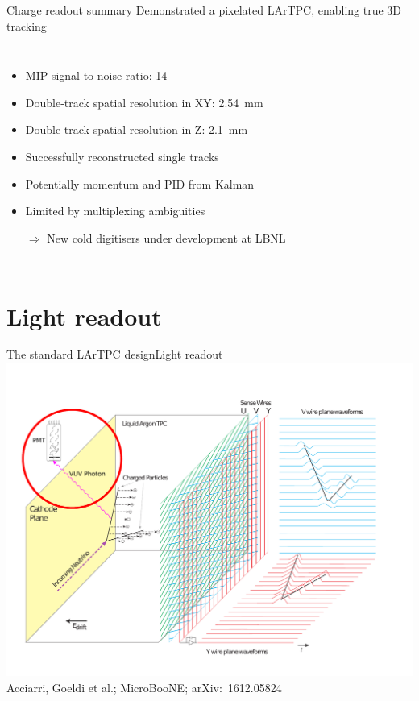 \documentclass[]{beamer}
\newcommand*{\emphcol}{red}
\newcommand*{\emphcoltitle}{blue}
\newcommand*{\uboone}{{MicroBooNE}}
\newcommand*{\lartpc}{{LArTPC}}
\begin{document}
\begin{frame}{Charge readout summary}{\color{\emphcoltitle} Demonstrated a pixelated \lartpc{}, enabling true 3D tracking}
	\begin{columns}[c]
		\centering
		
		\begin{itemize}
			\item MIP signal-to-noise ratio: \num{14}
			\item Double-track spatial resolution in XY: \SI{2.54}{\milli\metre}
			\item Double-track spatial resolution in Z: \SI{2.1}{\milli\metre}
			\item Successfully reconstructed single tracks
			\item Potentially momentum and PID from Kalman
			\item {\color{\emphcol} Limited by multiplexing ambiguities}
			\item[$\Rightarrow$] {\color{\emphcol} New cold digitisers under development at LBNL}
		\end{itemize}
	\end{columns}
\end{frame}

\section{Light readout}

\begin{frame}{The standard \lartpc{} design}{Light readout}
	\centering
	\includegraphics[viewport=30 40 720 540, clip, height=.66\textheight]{defence/TPCprinciple_light-ro}\\
	{\tiny Acciarri, Goeldi et al.; \uboone{}; arXiv:~1612.05824~\cite{uboone}}
\end{frame}
\end{document}
